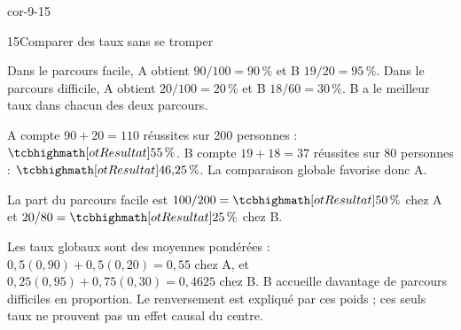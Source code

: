 \begin{blocLivre}{cor-9-15}
\begin{corrige}{15}{Comparer des taux sans se tromper}
\begin{questions}
\item Dans le parcours facile, A obtient $90/100=90\,\%$ et B $19/20=95\,\%$.
Dans le parcours difficile, A obtient $20/100=20\,\%$ et B $18/60=30\,\%$.
B a le meilleur taux dans chacun des deux parcours.
\item A compte $90+20=110$ réussites sur 200 personnes : $\res{55\,\%}$.
B compte $19+18=37$ réussites sur 80 personnes : $\res{46{,}25\,\%}$.
La comparaison globale favorise donc A.
\item La part du parcours facile est $100/200=\res{50\,\%}$ chez A et $20/80=\res{25\,\%}$ chez B.
\item Les taux globaux sont des moyennes pondérées :
$0{,}5(0{,}90)+0{,}5(0{,}20)=0{,}55$ chez A,
et $0{,}25(0{,}95)+0{,}75(0{,}30)=0{,}4625$ chez B.
B accueille davantage de parcours difficiles en proportion.
Le renversement est expliqué par ces poids ; ces seuls taux ne prouvent pas un effet causal du centre.
\end{questions}

\label{figlivre-r09-15-cor}

\end{corrige}
\end{blocLivre}
